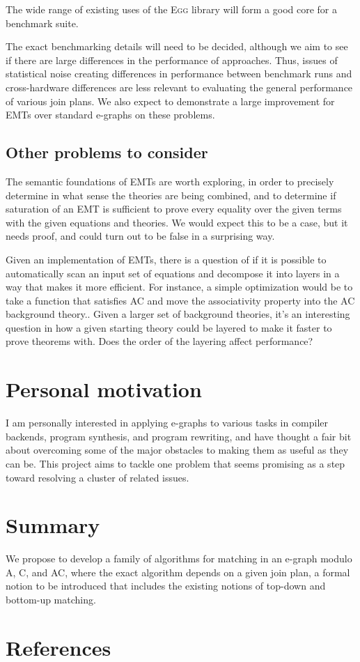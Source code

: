 \documentclass{article}
\begin{document}
The wide range of existing uses of the \textsc{Egg} library will form a good core for a benchmark suite.

The exact benchmarking details will need to be decided, although we aim to see if there are large differences in the performance of approaches. Thus, issues of statistical noise creating differences in performance between benchmark runs and cross-hardware differences are less relevant to evaluating the general performance of various join plans. We also expect to demonstrate a large improvement for EMTs over standard e-graphs on these problems.

\subsection{Other problems to consider}
The semantic foundations of EMTs are worth exploring, in order to precisely determine in what sense the theories are being combined, and to determine if saturation of an EMT is sufficient to prove every equality over the given terms with the given equations and theories. We would expect this to be a case, but it needs proof, and could turn out to be false in a surprising way.

Given an implementation of EMTs, there is a question of if it is possible to automatically scan an input set of equations and decompose it into layers in a way that makes it more efficient. For instance, a simple optimization would be to take a function that satisfies AC and move the associativity property into the AC background theory.. Given a larger set of background theories, it's an interesting question in how a given starting theory could be 
layered to make it faster to prove theorems with. Does the order of the layering affect performance?

\section{Personal motivation}
I am personally interested in applying e-graphs to various tasks in compiler backends, program synthesis, and program rewriting, and have thought a fair bit about overcoming some of the major obstacles to making them as useful as they can be. This project aims to tackle one problem that seems promising as a step toward resolving a cluster of related issues.

\section{Summary}
We propose to develop a family of algorithms for matching in an e-graph modulo A, C, and AC, where the exact algorithm depends on a given join plan, a formal notion to be introduced that includes the existing notions of top-down and bottom-up matching.

\section{References}




\end{document}
